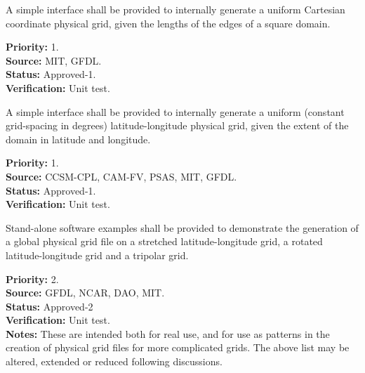 A simple interface shall be provided to internally generate a uniform Cartesian
coordinate physical grid, given the lengths of the edges of a square domain.
\begin{reqlist}
{\bf Priority:} 1. \\
{\bf Source:} MIT, GFDL. \\
{\bf Status:} Approved-1. \\
{\bf Verification:} Unit test. 
\end{reqlist}

A simple interface shall be provided to internally generate a uniform (constant
grid-spacing in degrees) latitude-longitude physical grid, given the extent of the domain
in latitude and longitude.                                                           
\begin{reqlist}
{\bf Priority:} 1. \\
{\bf Source:} CCSM-CPL, CAM-FV, PSAS, MIT, GFDL. \\
{\bf Status:} Approved-1. \\
{\bf Verification:} Unit test.
\end{reqlist}

Stand-alone software examples shall be provided to demonstrate the generation of a
global physical grid file on a stretched latitude-longitude grid, a rotated
latitude-longitude grid and a tripolar grid. 
\begin{reqlist}
{\bf Priority:} 2. \\
{\bf Source:} GFDL, NCAR, 
DAO, MIT. \\
{\bf Status:} Approved-2 \\
{\bf Verification:} Unit test.\\
{\bf Notes:} These are intended both for real use, and for use as patterns in the
creation of physical grid files for more complicated grids.  The above list may be
altered, extended or reduced following discussions.
\end{reqlist}

